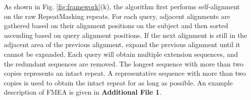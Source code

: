 \documentclass{bmcart}
\begin{document}
As shown in Fig. \ref{fig:framework}(k), the algorithm first performs self-alignment on the raw RepeatMasking repeats. For each query, adjacent alignments are gathered based on their alignment positions on the subject and then sorted ascending based on query alignment positions. If the next alignment is still in the adjacent area of the previous alignment, expand the previous alignment until it cannot be expanded. Each query will obtain multiple extension sequences, and the redundant sequences are removed. The longest sequence with more than two copies represents an intact repeat. A representative sequence with more than two copies is used to obtain the intact repeat for as long as possible. An example description of FMEA is given in \textbf{Additional File 1}.


%
%
%
\end{document}
